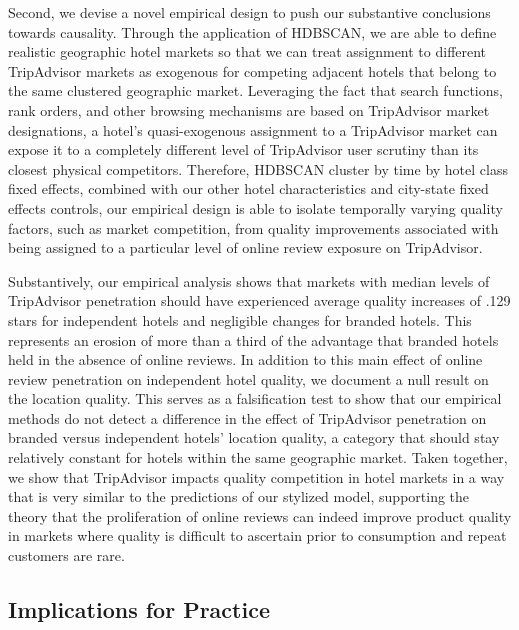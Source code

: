 \documentclass[mksc,blindrev]{informs3} %
\begin{document}
Second, we devise a novel empirical design to push our substantive conclusions towards causality. Through the application of HDBSCAN, we are able to define realistic geographic hotel markets so that we can treat assignment to different TripAdvisor markets as exogenous for competing adjacent hotels that belong to the same clustered geographic market. Leveraging the fact that search functions, rank orders, and other browsing mechanisms are based on TripAdvisor market designations, a hotel's quasi-exogenous assignment to a TripAdvisor market can expose it to a completely different level of TripAdvisor user scrutiny than its closest physical competitors. Therefore, HDBSCAN cluster by time by hotel class fixed effects, combined with our other hotel characteristics and city-state fixed effects controls, our empirical design is able to isolate temporally varying quality factors, such as market competition, from quality improvements associated with being assigned to a particular level of online review exposure on TripAdvisor.

Substantively, our empirical analysis shows that markets with median levels of TripAdvisor penetration should have experienced average quality increases of .129 stars for independent hotels and negligible changes for branded hotels. This represents an erosion of more than a third of the advantage that branded hotels held in the absence of online reviews. In addition to this main effect of online review penetration on independent hotel quality, we document a null result on the location quality. This serves as a falsification test to show that our empirical methods do not detect a difference in the effect of TripAdvisor penetration on branded versus independent hotels' location quality, a category that should stay relatively constant for hotels within the same geographic market. Taken together, we show that TripAdvisor impacts quality competition in hotel markets in a way that is very similar to the predictions of our stylized model, supporting the theory that the proliferation of online reviews can indeed improve product quality in markets where quality is difficult to ascertain prior to consumption and repeat customers are rare. 

\subsection{Implications for Practice}
\end{document}
